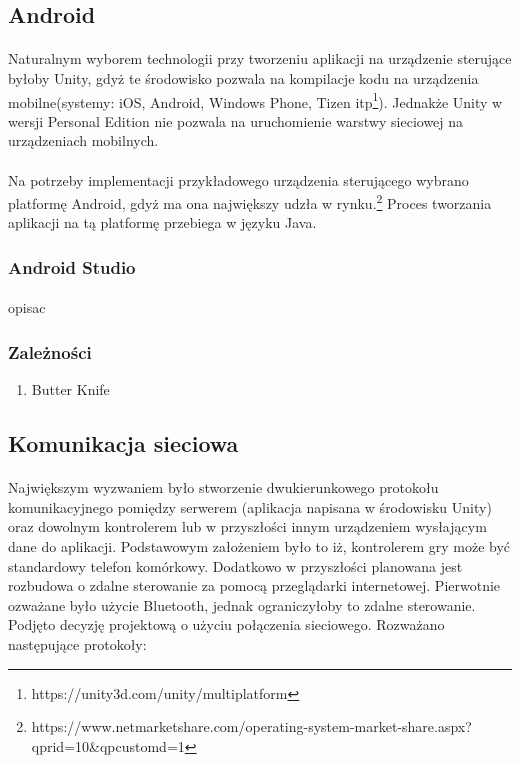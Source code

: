\subsection{Android}
\paragraph{}
Naturalnym wyborem technologii przy tworzeniu aplikacji na urządzenie sterujące byłoby Unity, gdyż te środowisko pozwala na kompilacje kodu na urządzenia mobilne(systemy: iOS, Android, Windows Phone, Tizen itp\footnote{https://unity3d.com/unity/multiplatform}). Jednakże Unity w wersji Personal Edition nie pozwala na uruchomienie warstwy sieciowej na urządzeniach mobilnych.
\paragraph{}
Na potrzeby implementacji przykładowego urządzenia sterującego wybrano platformę Android, gdyż ma ona największy udzła w rynku.\footnote{https://www.netmarketshare.com/operating-system-market-share.aspx?qprid=10\&qpcustomd=1} Proces tworzania aplikacji na tą platformę przebiega w języku Java.

\subsubsection{Android Studio}
\paragraph{}
opisac

\subsubsection{Zależności}
\begin{enumerate}
	\item Butter Knife
\end{enumerate}

\subsection{Komunikacja sieciowa}
\paragraph{}
Największym wyzwaniem było stworzenie dwukierunkowego protokołu komunikacyjnego pomiędzy serwerem (aplikacja napisana w środowisku Unity) oraz dowolnym kontrolerem lub w przyszłości innym urządzeniem wysłającym dane do aplikacji. Podstawowym założeniem było to iż, kontrolerem gry może być standardowy telefon komórkowy. Dodatkowo w przyszłości planowana jest rozbudowa o zdalne sterowanie za pomocą przeglądarki internetowej. Pierwotnie ozważane było użycie Bluetooth, jednak ograniczyłoby to zdalne sterowanie. Podjęto decyzję projektową o użyciu połączenia sieciowego. Rozważano następujące protokoły:

